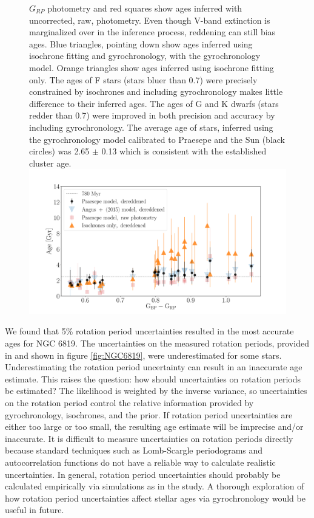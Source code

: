 {\begin{figure}
{    $G_{RP}$ photometry and red squares show ages inferred with uncorrected,
    raw, photometry.
    Even though V-band extinction is marginalized over in the inference
    process, reddening can still bias ages.
    Blue triangles, pointing down show ages inferred using isochrone fitting
    and gyrochronology, with the \citet{angus2015} gyrochronology model.
    Orange triangles show ages inferred using isochrone fitting only.
    The ages of F stars (stars bluer than 0.7) were precisely constrained by
    isochrones and including gyrochronology makes little difference to their
    inferred ages.
    The ages of G and K dwarfs (stars redder than 0.7) were improved in both
    precision and accuracy by including gyrochronology.
    The average age of stars, inferred using the gyrochronology model
    calibrated to Praesepe and the Sun (black circles) was 2.65 $\pm$ 0.13
    which is consistent with the established cluster age.
}
  \centering
    \includegraphics[width=1\textwidth]{NGC6819_results}
\label{fig:NGC6819_results}
\end{figure}

We found that 5\% rotation period uncertainties resulted in the most accurate
ages for NGC 6819.
The uncertainties on the measured rotation periods, provided in
\citet{meibom2015} and shown in figure \ref{fig:NGC6819}, were underestimated
for some stars.
Underestimating the rotation period uncertainty can result in an inaccurate
age estimate.
This raises the question: how should uncertainties on rotation periods be
estimated?
The likelihood is weighted by the inverse variance, so uncertainties on the
rotation period control the relative information provided by gyrochronology,
isochrones, and the prior.
If rotation period uncertainties are either too large or too small, the
resulting age estimate will be imprecise and/or inaccurate.
It is difficult to measure uncertainties on rotation periods directly because
standard techniques such as Lomb-Scargle periodograms and autocorrelation
functions do not have a reliable way to calculate realistic uncertainties.
In general, rotation period uncertainties should probably be calculated
empirically via simulations as in the \citet{aigrain2015} study.
A thorough exploration of how rotation period uncertainties affect stellar
ages via gyrochronology would be useful in future.}

